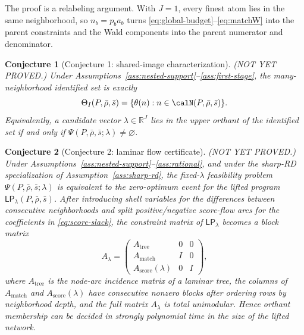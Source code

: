 \documentclass[11pt]{article}
\newcommand{\R}{\mathbb{R}}
\theoremstyle{definition}
\theoremstyle{plain}
\newtheorem{conjecture}{Conjecture}
\theoremstyle{remark}
\begin{document}
The proof is a relabeling argument.  With \(J=1\), every finest atom lies in the same
neighborhood, so \(n_b=p_b a_b\) turns \eqref{eq:global-budget}--\eqref{eq:matchW} into the
parent constraints and the Wald components into the parent numerator and denominator.

\begin{conjecture}[Conjecture 1: shared-image characterization]\label{conj:shared-image}
(NOT YET PROVED.)  Under Assumptions~\ref{ass:nested-support}--\ref{ass:first-stage}, the
many-neighborhood identified set is exactly
\[
  \Theta_I(P,\bar\rho,\bar s)=\{\theta(n):n\in\calN(P,\bar\rho,\bar s)\}.
\]
Equivalently, a candidate vector \(\lambda\in\R^J\) lies in the upper orthant of the
identified set if and only if \(\Psi(P,\bar\rho,\bar s;\lambda)\neq\varnothing\).
\end{conjecture}

\begin{conjecture}[Conjecture 2: laminar flow certificate]\label{conj:flow-certificate}
(NOT YET PROVED.)  Under Assumptions~\ref{ass:nested-support}--\ref{ass:rational}, and under
the sharp-RD specialization of Assumption~\ref{ass:sharp-rd}, the fixed-\(\lambda\) feasibility
problem \(\Psi(P,\bar\rho,\bar s;\lambda)\) is equivalent to the zero-optimum event for the
lifted program \(\mathsf{LP}_\lambda(P,\bar\rho,\bar s)\).  After introducing shell variables
for the differences between consecutive neighborhoods and split positive/negative score-flow
arcs for the coefficients in \eqref{eq:score-slack}, the constraint matrix of
\(\mathsf{LP}_\lambda\) becomes a block matrix
\[
  A_\lambda=
  \begin{pmatrix}
    A_{\mathrm{tree}} & 0 & 0 \\
    A_{\mathrm{match}} & I & 0 \\
    A_{\mathrm{score}}(\lambda) & 0 & I
  \end{pmatrix},
\]
where \(A_{\mathrm{tree}}\) is the node-arc incidence matrix of a laminar tree, the columns of
\(A_{\mathrm{match}}\) and \(A_{\mathrm{score}}(\lambda)\) have consecutive nonzero blocks after
ordering rows by neighborhood depth, and the full matrix \(A_\lambda\) is total unimodular.
Hence orthant membership can be decided in strongly polynomial time in the size of the lifted
network.
\end{conjecture}
\end{document}
